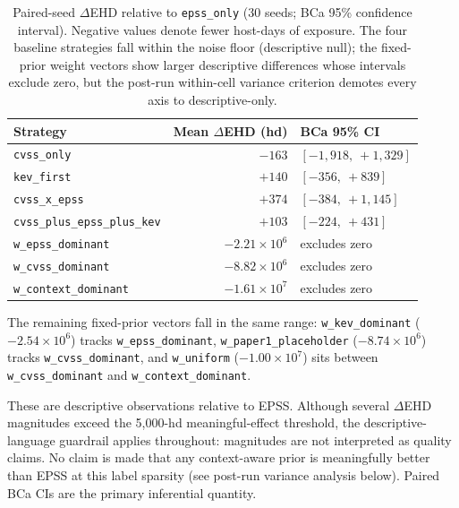 \begin{table}[t]
\centering
\caption{Paired-seed $\Delta$EHD relative to \texttt{epss\_only} (30 seeds; BCa 95\% confidence interval). Negative values denote fewer host-days of exposure. The four baseline strategies fall within the noise floor (descriptive null); the fixed-prior weight vectors show larger descriptive differences whose intervals exclude zero, but the post-run within-cell variance criterion demotes every axis to descriptive-only.}
\label{tab:ehd}
\begin{tabular}{@{}lrl@{}}
\toprule
Strategy & Mean $\Delta$EHD (hd) & BCa 95\% CI \\
\midrule
\texttt{cvss\_only}                  & $-163$            & $[-1{,}918,\ +1{,}329]$ \\
\texttt{kev\_first}                  & $+140$            & $[-356,\ +839]$ \\
\texttt{cvss\_x\_epss}               & $+374$            & $[-384,\ +1{,}145]$ \\
\texttt{cvss\_plus\_epss\_plus\_kev} & $+103$            & $[-224,\ +431]$ \\
\midrule
\texttt{w\_epss\_dominant}           & $-2.21\times10^6$ & excludes zero \\
\texttt{w\_cvss\_dominant}           & $-8.82\times10^6$ & excludes zero \\
\texttt{w\_context\_dominant}        & $-1.61\times10^7$ & excludes zero \\
\bottomrule
\end{tabular}
\end{table}

The remaining fixed-prior vectors fall in the same range: \texttt{w\_kev\_dominant} ($-2.54\times10^6$) tracks \texttt{w\_epss\_dominant}, \texttt{w\_paper1\_placeholder} ($-8.74\times10^6$) tracks \texttt{w\_cvss\_dominant}, and \texttt{w\_uniform} ($-1.00\times10^7$) sits between \texttt{w\_cvss\_dominant} and \texttt{w\_context\_dominant}.

These are descriptive observations relative to EPSS. Although several $\Delta$EHD magnitudes exceed the 5,000-hd meaningful-effect threshold, the descriptive-language guardrail applies throughout: magnitudes are not interpreted as quality claims. No claim is made that any context-aware prior is meaningfully better than EPSS at this label sparsity (see post-run variance analysis below). Paired BCa CIs are the primary inferential quantity.

